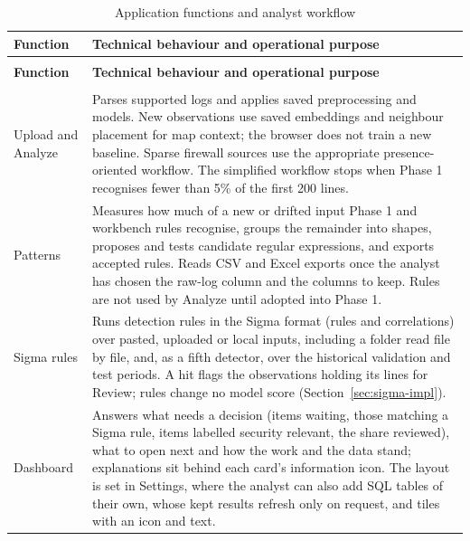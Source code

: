 \documentclass[11pt,a4paper]{article}
\begin{document}
\begingroup
\small
\begin{longtable}{>{\RaggedRight\arraybackslash}p{}>{\RaggedRight\arraybackslash}p{}}
\caption{Application functions and analyst workflow}\label{tab:4}\\
\toprule
\rowcolor{pale} \textbf{Function} & \textbf{Technical behaviour and operational purpose} \\
\midrule
\endfirsthead
\multicolumn{2}{l}{\small\itshape Table \thetable{} --- continued}\\
\toprule
\rowcolor{pale} \textbf{Function} & \textbf{Technical behaviour and operational purpose} \\
\midrule
\endhead
\midrule
\multicolumn{2}{r}{\footnotesize Continued on the next page}\\
\endfoot
\bottomrule
\endlastfoot
Upload and Analyze & Parses supported logs and applies saved preprocessing and models. New observations use saved embeddings and neighbour placement for map context; the browser does not train a new baseline. Sparse firewall sources use the appropriate presence-oriented workflow. The simplified workflow stops when Phase 1 recognises fewer than 5\% of the first 200 lines. \\[3pt]
Patterns & Measures how much of a new or drifted input Phase 1 and workbench rules recognise, groups the remainder into shapes, proposes and tests candidate regular expressions, and exports accepted rules. Reads CSV and Excel exports once the analyst has chosen the raw-log column and the columns to keep. Rules are not used by Analyze until adopted into Phase 1. \\[3pt]
Sigma rules & Runs detection rules in the Sigma format (rules and correlations) over pasted, uploaded or local inputs, including a folder read file by file, and, as a fifth detector, over the historical validation and test periods. A hit flags the observations holding its lines for Review; rules change no model score (Section~\ref{sec:sigma-impl}). \\[3pt]
Dashboard & Answers what needs a decision (items waiting, those matching a Sigma rule, items labelled security relevant, the share reviewed), what to open next and how the work and the data stand; explanations sit behind each card's information icon. The layout is set in Settings, where the analyst can also add SQL tables of their own, whose kept results refresh only on request, and tiles with an icon and text. \\[3pt]

\end{longtable}
\end{document}
